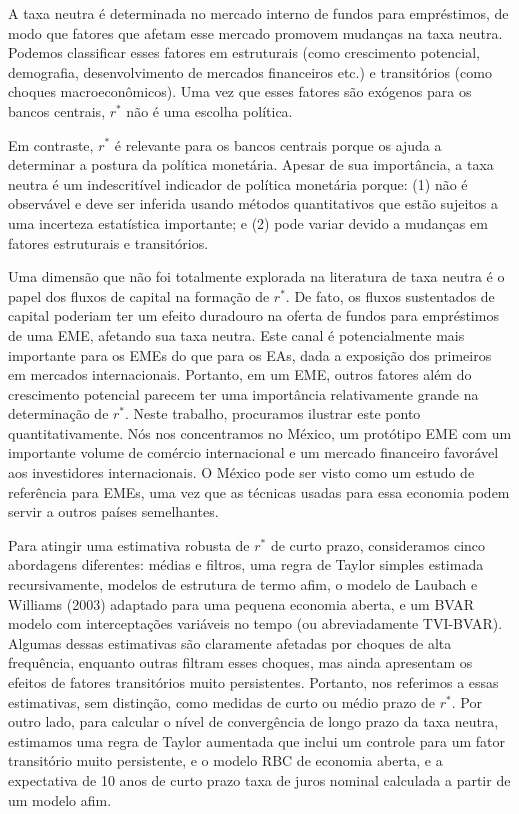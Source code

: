 A taxa neutra é determinada no mercado interno de fundos para empréstimos, de modo que fatores que afetam esse mercado promovem mudanças na taxa neutra. Podemos classificar esses fatores em estruturais (como crescimento potencial, demografia, desenvolvimento de mercados financeiros etc.) e transitórios (como choques macroeconômicos). Uma vez que esses fatores são exógenos para os bancos centrais, $r^{*}$ não é uma escolha política.

Em contraste, $r^{*}$ é relevante para os bancos centrais porque os ajuda a determinar a postura da política monetária. Apesar de sua importância, a taxa neutra é um indescritível indicador de política monetária porque: (1) não é observável e deve ser inferida usando métodos quantitativos que estão sujeitos a uma incerteza estatística importante; e (2) pode variar devido a mudanças em fatores estruturais e transitórios.

Uma dimensão que não foi totalmente explorada na literatura de taxa neutra é o papel dos fluxos de capital na formação de $r^{*}$. De fato, os fluxos sustentados de capital poderiam ter um efeito duradouro na oferta de fundos para empréstimos de uma EME, afetando sua taxa neutra. Este canal é potencialmente mais importante para os EMEs do que para os EAs, dada a exposição dos primeiros em mercados internacionais. Portanto, em um EME, outros fatores além do crescimento potencial parecem ter uma importância relativamente grande na determinação de $r^{*}$. Neste trabalho, procuramos ilustrar este ponto quantitativamente. Nós nos concentramos no México, um protótipo EME com um importante volume de comércio internacional e um mercado financeiro favorável aos investidores internacionais. O México pode ser visto como um estudo de referência para EMEs, uma vez que as técnicas usadas para essa economia podem servir a outros países semelhantes.

Para atingir uma estimativa robusta de $r^{*}$ de curto prazo, consideramos cinco abordagens diferentes: médias e filtros, uma regra de Taylor simples estimada recursivamente, modelos de estrutura de termo afim, o modelo de Laubach e Williams (2003) adaptado para uma pequena economia aberta, e um BVAR modelo com interceptações variáveis no tempo (ou abreviadamente TVI-BVAR). Algumas dessas estimativas são claramente afetadas por choques de alta frequência, enquanto outras filtram esses choques, mas ainda apresentam os efeitos de fatores transitórios muito persistentes. Portanto, nos referimos a essas estimativas, sem distinção, como medidas de curto ou médio prazo de $r^{*}$. Por outro lado, para calcular o nível de convergência de longo prazo da taxa neutra, estimamos uma regra de Taylor aumentada que inclui um controle para um fator transitório muito persistente, e o modelo RBC de economia aberta, e a expectativa de 10 anos de curto prazo taxa de juros nominal calculada a partir de um modelo afim.

